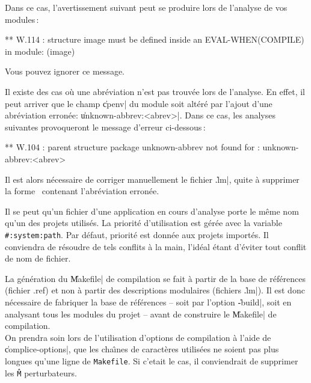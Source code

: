 Dans ce cas, l'avertissement suivant peut se produire lors de
l'analyse de vos modules\,:

\begin{Longcode*}
** W.114 :
structure image must be defined inside an EVAL-WHEN(COMPILE) in module:
(image)
\end{Longcode*}

Vous pouvez ignorer ce message.



Il existe des cas o\`{u} une abr\'{e}viation n'est pas trouv\'{e}e lors de
l'analyse.
En effet, il peut arriver que le champ \|cpenv| du module soit alt\'{e}r\'{e} par
l'ajout d'une abr\'{e}viation erron\'{e}e: \|{unknown-abbrev}:<abrev>|.
Dans ce cas, les analyses suivantes provoqueront le message d'erreur
ci-dessous\,:

\begin{Code*}
** W.104 : parent structure package unknown-abbrev not found for : {
unknown-abbrev}:<abrev>
\end{Code*}

Il est alors n\'{e}cessaire de corriger manuellement le fichier \|.lm|, 
quite \`{a} supprimer la forme \LeLisp\ contenant l'abr\'{e}viation erron\'{e}e.

Il se peut qu'un fichier d'une application en cours d'analyse porte le
m\^{e}me nom qu'un des projets utilis\'{e}s.
La priorit\'{e} d'utilisation est g\'{e}r\'{e}e avec la variable {\tt
\#:system:path}. Par d\'{e}faut, priorit\'{e} est donn\'{e}e aux projets import\'{e}s.
Il conviendra de r\'{e}soudre de tels conflits
\`{a} la main, l'id\'{e}al \'{e}tant d'\'{e}viter tout conflit de nom de
fichier.



La g\'{e}n\'{e}ration du \|Makefile| de compilation se fait \`{a} partir de la
base de r\'{e}f\'{e}rences (fichier .ref) et non \`{a} partir des descriptions
modulaires (fichiers \|.lm|). Il est donc n\'{e}cessaire de fabriquer la
base de r\'{e}f\'{e}rences -- soit par l'option \|-build|, soit en analysant
tous les modules du projet -- avant de construire le \|Makefile|
de compilation. \\
On prendra soin lors de l'utilisation d'options de compilation \`{a}
l'aide de \|complice-options|, que les cha\^{\i}nes de caract\`{e}res
utilis\'{e}es ne soient pas plus longues qu'une ligne de {\tt Makefile}.
Si c'etait le cas, il conviendrait de supprimer les {\tt \^M}
perturbateurs.



